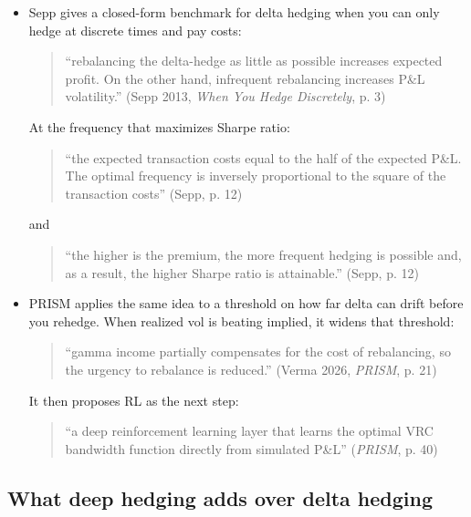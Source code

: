 \documentclass{article}
\begin{document}
\begin{itemize}

\item Sepp gives a closed-form benchmark for delta hedging when you can only hedge at discrete times and pay costs:

\begin{quote}``rebalancing the delta-hedge as little as possible increases expected profit. On the other hand, infrequent rebalancing increases P\&L volatility.'' (Sepp 2013, \emph{When You Hedge Discretely}, p. 3)\end{quote}

At the frequency that maximizes Sharpe ratio:

\begin{quote}``the expected transaction costs equal to the half of the expected P\&L. The optimal frequency is inversely proportional to the square of the transaction costs'' (Sepp, p. 12)\end{quote}

and

\begin{quote}``the higher is the premium, the more frequent hedging is possible and, as a result, the higher Sharpe ratio is attainable.'' (Sepp, p. 12)\end{quote}

\item PRISM applies the same idea to a threshold on how far delta can drift before you rehedge. When realized vol is beating implied, it widens that threshold:

\begin{quote}``gamma income partially compensates for the cost of rebalancing, so the urgency to rebalance is reduced.'' (Verma 2026, \emph{PRISM}, p. 21)\end{quote}

It then proposes RL as the next step:

\begin{quote}``a deep reinforcement learning layer that learns the optimal VRC bandwidth function directly from simulated P\&L'' (\emph{PRISM}, p. 40)\end{quote}

\end{itemize}

\subsection{What deep hedging adds over delta hedging}
\end{document}
